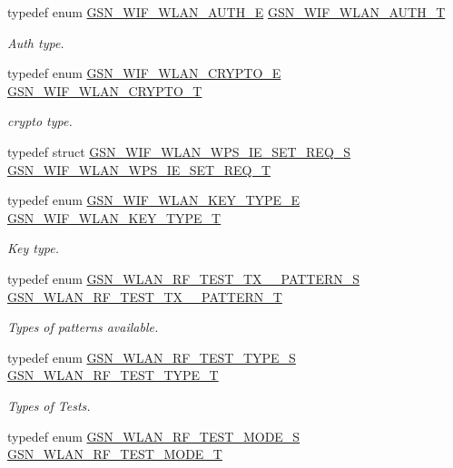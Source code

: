 \begin{DoxyCompactItemize}
typedef enum \hyperlink{a00677_ga2b3917a91d576d0d037c406e6397cab9}{GSN\_\-WIF\_\-WLAN\_\-AUTH\_\-E} \hyperlink{a00677_ga07b4b8b059f529183cc5da3aadfa2966}{GSN\_\-WIF\_\-WLAN\_\-AUTH\_\-T}
\begin{DoxyCompactList}\small\item\em Auth type. \end{DoxyCompactList}\item 
typedef enum \hyperlink{a00677_ga49c8ff4188538f53965f3e0916f59746}{GSN\_\-WIF\_\-WLAN\_\-CRYPTO\_\-E} \hyperlink{a00677_gac2cbed9ce43ac5da06c3a3396bbaaf31}{GSN\_\-WIF\_\-WLAN\_\-CRYPTO\_\-T}
\begin{DoxyCompactList}\small\item\em crypto type. \end{DoxyCompactList}\item 
typedef struct \hyperlink{a00415}{GSN\_\-WIF\_\-WLAN\_\-WPS\_\-IE\_\-SET\_\-REQ\_\-S} \hyperlink{a00677_ga07d4ca8f04e21011d1e7b071ee2b376a}{GSN\_\-WIF\_\-WLAN\_\-WPS\_\-IE\_\-SET\_\-REQ\_\-T}
\item 
typedef enum \hyperlink{a00677_ga738f68b803d29587618534b884d8b600}{GSN\_\-WIF\_\-WLAN\_\-KEY\_\-TYPE\_\-E} \hyperlink{a00677_gab0871ec1fe022833d9573d32749bd7c4}{GSN\_\-WIF\_\-WLAN\_\-KEY\_\-TYPE\_\-T}
\begin{DoxyCompactList}\small\item\em Key type. \end{DoxyCompactList}\item 
typedef enum \hyperlink{a00677_ga651010efc8cff4e360fd72c7d32a70a9}{GSN\_\-WLAN\_\-RF\_\-TEST\_\-TX\_\_\-PATTERN\_\-S} \hyperlink{a00677_gaf2d0e783b6db5c93a78ee3d99153ebcb}{GSN\_\-WLAN\_\-RF\_\-TEST\_\-TX\_\_\-PATTERN\_\-T}
\begin{DoxyCompactList}\small\item\em Types of patterns available. \end{DoxyCompactList}\item 
typedef enum \hyperlink{a00677_ga3c5fd791827dffd656e69ad09ce2304e}{GSN\_\-WLAN\_\-RF\_\-TEST\_\-TYPE\_\-S} \hyperlink{a00677_ga58d933da4429968a4151ae6b2106281b}{GSN\_\-WLAN\_\-RF\_\-TEST\_\-TYPE\_\-T}
\begin{DoxyCompactList}\small\item\em Types of Tests. \end{DoxyCompactList}\item 
typedef enum \hyperlink{a00677_ga8d2c2dc6c9f7927c5cf4634d7b403b95}{GSN\_\-WLAN\_\-RF\_\-TEST\_\-MODE\_\-S} \hyperlink{a00677_ga05896005da162a0b0f4b304f7c551947}{GSN\_\-WLAN\_\-RF\_\-TEST\_\-MODE\_\-T}

\end{DoxyCompactItemize}
